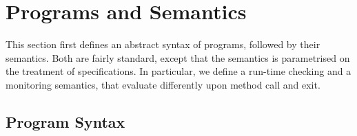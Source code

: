 \section{Programs and Semantics}\label{SecProgram}

This section first defines an abstract syntax of programs, followed by
their semantics. Both are fairly standard, except that the semantics
is parametrised on the treatment of specifications. In particular, we
define a run-time checking and a monitoring semantics, that evaluate
differently upon method call and exit.


\subsection{Program Syntax}\label{SecSyntax}

